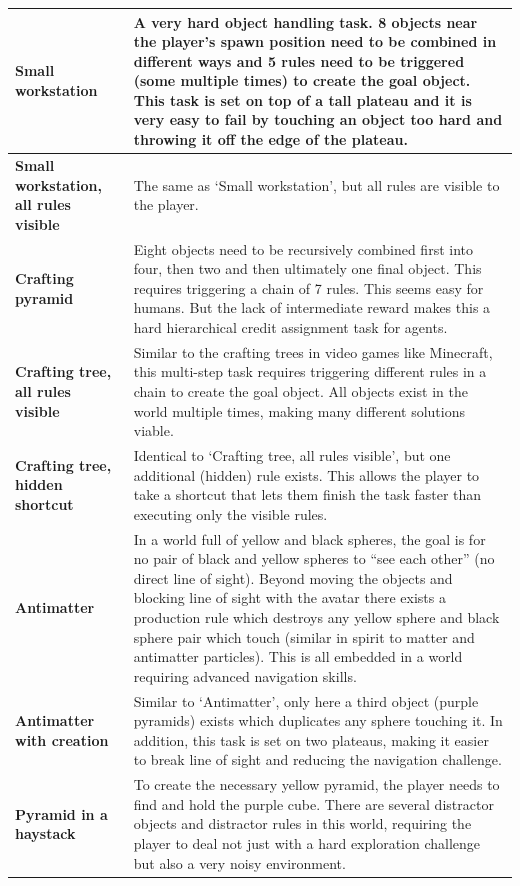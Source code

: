 \documentclass[11pt, a4paper, logo, copyright]{deepmind}
\begin{document}
\begin{appendix}
\begin{longtable}{|>{\raggedright}p{4cm}|p{12cm}|}
\textbf{Small workstation} & A very hard object handling task. 8 objects near the player's spawn position need to be combined in different ways and 5 rules need to be triggered (some multiple times) to create the goal object. This task is set on top of a tall plateau and it is very easy to fail by touching an object too hard and throwing it off the edge of the plateau. \\ \hline
\textbf{Small workstation, all rules visible} & The same as `Small workstation', but all rules are visible to the player. \\ \hline
\textbf{Crafting pyramid} & Eight objects need to be recursively combined first into four, then two and then ultimately one final object. This requires triggering a chain of 7 rules. This seems easy for humans. But the lack of intermediate reward makes this a hard hierarchical credit assignment task for agents. \\ \hline
\textbf{Crafting tree, all rules visible} & Similar to the crafting trees in video games like Minecraft, this multi-step task requires triggering different rules in a chain to create the goal object. All objects exist in the world multiple times, making many different solutions viable. \\ \hline
\textbf{Crafting tree, hidden shortcut} & Identical to `Crafting tree, all rules visible', but one additional (hidden) rule exists. This allows the player to take a shortcut that lets them finish the task faster than executing only the visible rules. \\ \hline
\textbf{Antimatter} & In a world full of yellow and black spheres, the goal is for no pair of black and yellow spheres to ``see each other'' (no direct line of sight). Beyond moving the objects and blocking line of sight with the avatar there exists a production rule which destroys any yellow sphere and black sphere pair which touch (similar in spirit to matter and antimatter particles). This is all embedded in a world requiring advanced navigation skills. \\ \hline
\textbf{Antimatter with creation} & Similar to `Antimatter', only here a third object (purple pyramids) exists which duplicates any sphere touching it. In addition, this task is set on two plateaus, making it easier to break line of sight and reducing the navigation challenge. \\ \hline
\textbf{Pyramid in a haystack} & To create the necessary yellow pyramid, the player needs to find and hold the purple cube. There are several distractor objects and distractor rules in this world, requiring the player to deal not just with a hard exploration challenge but also a very noisy environment. \\ \hline

\end{longtable}
\end{appendix}
\end{document}
